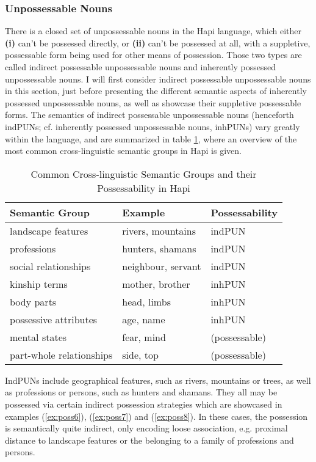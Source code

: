 \documentclass[a4paper, 12pt, oneside]{memoir}
\begin{document}
\subsubsection{Unpossessable Nouns}\label{sinalien}
There is a closed set of unpossessable nouns in the Hapi language, which either \textbf{(i)} can't be possessed directly, or \textbf{(ii)} can't be possessed at all, with a suppletive, possessable form being used for other means of possession. Those two types are called indirect possessable unpossessable nouns and inherently possessed unpossessable nouns. I will first consider indirect possessable unpossessable nouns in this section, just before presenting the different semantic aspects of inherently possessed unpossessable nouns, as well as showcase their suppletive possessable forms. 
The semantics of indirect possessable unpossessable nouns (henceforth indPUNs; cf. inherently possessed unpossessable nouns, inhPUNs) vary greatly within the language, and are summarized in table \ref{t:ccsgip}, where an overview of the most common cross-linguistic semantic groups in Hapi is given.
\begin{table}[H]
\centering
\captionsetup{justification=centering}
\begin{tabular}{@{}lll@{}}
\toprule
Semantic Group & Example & Possessability \\ \midrule
landscape features & rivers, mountains & indPUN \\
professions & hunters, shamans & indPUN \\
social relationships & neighbour, servant & indPUN \\
kinship terms & mother, brother & inhPUN \\
body parts & head, limbs & inhPUN \\
possessive attributes & age, name & inhPUN \\
mental states & fear, mind & (possessable) \\
part-whole relationships & side, top & (possessable) \\ \bottomrule
\end{tabular}
\caption{Common Cross-linguistic Semantic Groups and their Possessability in Hapi}
\label{t:ccsgip}
\end{table}
IndPUNs include geographical features, such as rivers, mountains or trees, as well as professions or persons, such as hunters and shamans. 
They all may be possessed via certain indirect possession strategies which are showcased in examples (\ref{ex:poss6}), (\ref{ex:poss7}) and (\ref{ex:poss8}). In these cases, the possession is semantically quite indirect, only encoding loose association, e.g. proximal distance to landscape features or the belonging to a family of professions and persons. 
\end{document}
